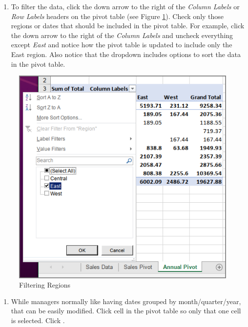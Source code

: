 \begin{enumerate}[resume]
	\item To filter the data, click the down arrow to the right of the \textit{Column Labels} or \textit{Row Labels} headers on the pivot table (see Figure \ref{07:fig22}). Check only those regions or dates that should be included in the pivot table. For example, click the down arrow to the right of the \textit{Column Labels} and uncheck everything except \textit{East} and notice how the pivot table is updated to include only the East region. Also notice that the dropdown includes options to sort the data in the pivot table.
\end{enumerate}

\begin{figure}[H]
	\centering
	\includegraphics[width=\maxwidth{.95\linewidth}]{gfx/ch07_fig22}
	\caption{Filtering Regions}
	\label{07:fig22}
\end{figure}

\begin{enumerate}[resume]
	\item While managers normally like having dates grouped by month/quarter/year, that can be easily modified. Click cell  in the pivot table so only that one cell is selected. Click .
\end{enumerate}

